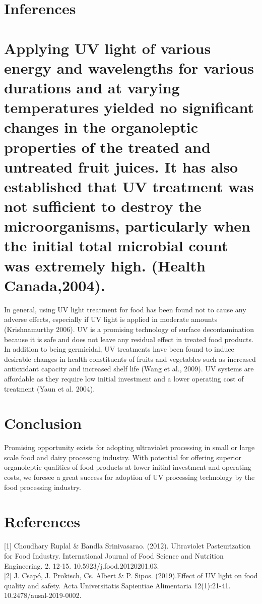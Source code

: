 \documentclass[journal]{IEEEtran}
\begin{document}
\section{Inferences}
\section{Applying UV light of various energy and wavelengths for various durations and at varying temperatures yielded no significant changes in the organoleptic properties of the treated and untreated fruit juices. It has also established that UV treatment was not sufficient to destroy the microorganisms, particularly when the initial total microbial count was extremely high. (Health Canada,2004).}
In general, using UV light treatment for food has been found not to cause any adverse effects, especially if UV light is applied in moderate amounts (Krishnamurthy 2006).
UV is a promising technology of surface decontamination because it is safe and does not leave any residual effect in treated food products. In addition to being germicidal, UV treatments have been found to induce desirable changes in health constituents of fruits and vegetables such as increased antioxidant capacity and increased shelf life (Wang et al., 2009). UV systems are affordable as they require low initial investment and a lower operating cost of treatment (Yaun et al. 2004).
\section{Conclusion}

Promising opportunity exists for adopting ultraviolet processing in small or large scale food and dairy processing industry. With potential for offering superior organoleptic qualities of food products at lower initial investment and operating costs, we foresee a great success for adoption of UV processing technology by the food processing industry.


\section*{References}
\printbibliography

[1] Choudhary Ruplal \& Bandla Srinivasarao. (2012). Ultraviolet Pasteurization for Food Industry. International Journal of Food Science and Nutrition Engineering. 2. 12-15. 10.5923/j.food.20120201.03.\\[0.001in] 

[2] J. Csapó, J. Prokisch, Cs. Albert \&  P. Sipos. (2019).Effect of UV light on food quality and safety. Acta Universitatis Sapientiae Alimentaria 12(1):21-41. 10.2478/ausal-2019-0002.\\[0.001in]
\end{document}
